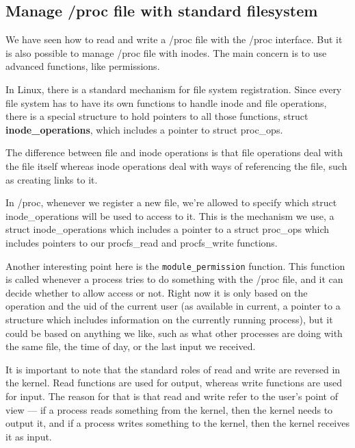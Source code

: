 \documentclass[10pt, oneside]{book}
\begin{document}

\subsection{Manage /proc file with standard filesystem}
\label{sec:manage_procfs}
We have seen how to read and write a /proc file with the /proc interface.
But it is also possible to manage /proc file with inodes.
The main concern is to use advanced functions, like permissions.

In Linux, there is a standard mechanism for file system registration.
Since every file system has to have its own functions to handle inode and file operations, there is a special structure to hold pointers to all those functions, struct \textbf{inode\_operations}, which includes a pointer to struct proc\_ops.

The difference between file and inode operations is that file operations deal with the file itself whereas inode operations deal with ways of referencing the file, such as creating links to it.

In /proc, whenever we register a new file, we're allowed to specify which struct inode\_operations will be used to access to it.
This is the mechanism we use, a struct inode\_operations which includes a pointer to a struct proc\_ops which includes pointers to our procfs\_read and procfs\_write functions.

Another interesting point here is the \verb|module_permission| function.
This function is called whenever a process tries to do something with the /proc file, and it can decide whether to allow access or not.
Right now it is only based on the operation and the uid of the current user (as available in current, a pointer to a structure which includes information on the currently running process), but it could be based on anything we like, such as what other processes are doing with the same file, the time of day, or the last input we received.

It is important to note that the standard roles of read and write are reversed in the kernel.
Read functions are used for output, whereas write functions are used for input.
The reason for that is that read and write refer to the user's point of view --- if a process reads something from the kernel, then the kernel needs to output it, and if a process writes something to the kernel, then the kernel receives it as input.

\end{document}
